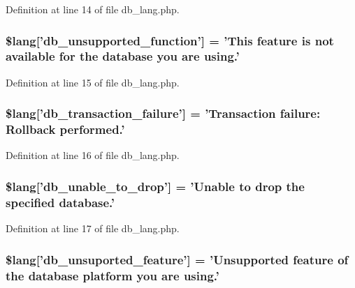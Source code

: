 Definition at line 14 of file db\-\_\-lang.\-php.

\hypertarget{db__lang_8php_a77c256be8532e23e8463481f51732116}{
\subsubsection[{\$lang}]{\setlength{\rightskip}{0pt plus 5cm}\$lang\mbox{[}'db\-\_\-unsupported\-\_\-function'\mbox{]} = 'This feature is {\bf not} available {\bf for} the database you are using.'}}\label{db__lang_8php_a77c256be8532e23e8463481f51732116}


Definition at line 15 of file db\-\_\-lang.\-php.

\hypertarget{db__lang_8php_a35f225a7ead01f13f8c6423b7c7433a0}{
\subsubsection[{\$lang}]{\setlength{\rightskip}{0pt plus 5cm}\$lang\mbox{[}'db\-\_\-transaction\-\_\-failure'\mbox{]} = 'Transaction failure\-: Rollback performed.'}}\label{db__lang_8php_a35f225a7ead01f13f8c6423b7c7433a0}


Definition at line 16 of file db\-\_\-lang.\-php.

\hypertarget{db__lang_8php_af391f0d50d64cbb95cd733fa947fdb5e}{
\subsubsection[{\$lang}]{\setlength{\rightskip}{0pt plus 5cm}\$lang\mbox{[}'db\-\_\-unable\-\_\-to\-\_\-drop'\mbox{]} = 'Unable {\bf to} drop the specified database.'}}\label{db__lang_8php_af391f0d50d64cbb95cd733fa947fdb5e}


Definition at line 17 of file db\-\_\-lang.\-php.

\hypertarget{db__lang_8php_a2841b382e3764873e7e740523106d851}{
\subsubsection[{\$lang}]{\setlength{\rightskip}{0pt plus 5cm}\$lang\mbox{[}'db\-\_\-unsuported\-\_\-feature'\mbox{]} = 'Unsupported feature of the database platform you are using.'}}\label{db__lang_8php_a2841b382e3764873e7e740523106d851}


